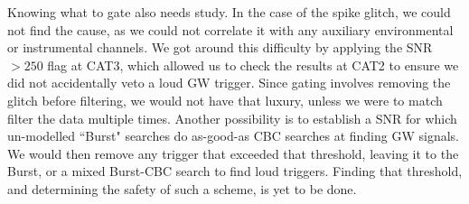 Knowing what to gate also needs study. In the case of the spike glitch, we
could not find the cause, as we could not correlate it with any auxiliary
environmental or instrumental channels. We got around this difficulty by
applying the \ac{SNR} $> 250$ flag at CAT3, which allowed us to check the
results at CAT2 to ensure we did not accidentally veto a loud \ac{GW} trigger.
Since gating involves removing the glitch before filtering, we would not have
that luxury, unless we were to match filter the data multiple times. Another
possibility is to establish a \ac{SNR} for which un-modelled ``Burst" searches
do as-good-as \ac{CBC} searches at finding \ac{GW} signals. We would then
remove any trigger that exceeded that threshold, leaving it to the Burst, or a
mixed Burst-\ac{CBC} search to find loud triggers.  Finding that threshold, and
determining the safety of such a scheme, is yet to be done.

